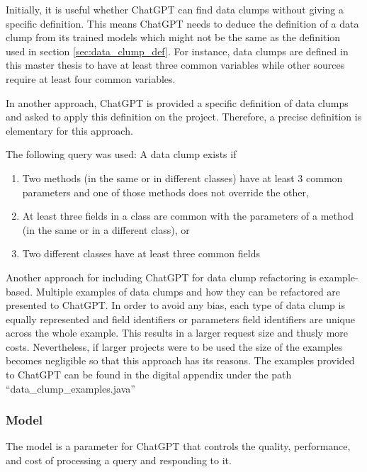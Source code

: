 Initially, it is useful whether ChatGPT can find data clumps without giving a specific definition. This means ChatGPT needs to deduce the definition of a data clump from its trained models which might not be the same as the definition used in section \ref{sec:data_clump_def}. For instance, data clumps are defined in this master thesis to have at least three common variables while other sources require at least four common variables. 
\begin{comment}
Nevertheless, the results are fairly good. ChatGPT ignores the inheritance between \textit{MathStuff} and \textit{BetterMathStuff} and does not output a data clump for each method in \textit{MathStuff}
\end{comment}


In another approach, ChatGPT is provided a specific definition of data clumps and asked to apply this definition on the project. Therefore, a precise definition is elementary for this approach.

The following query was used:
A data clump exists if
\begin{enumerate}
\item  Two methods (in the same or in different classes) have at least 3 common parameters
    and one of those methods does not override the other, 
\item At least three fields in a class are common with the parameters of a method (in the same or in a different class), or 
\item Two different classes have at least three common fields
\end{enumerate}


Another approach for including ChatGPT for data clump refactoring is example-based. Multiple examples of data clumps and how they can be refactored are presented to ChatGPT. In order to avoid any bias, each type of data clump is equally represented and field identifiers or parameters field identifiers are unique across the whole example. This results in a larger request size and thusly more costs. Nevertheless, if larger projects were to be used the size of the examples becomes negligible so that this approach has its reasons. The examples provided to ChatGPT can be found in the digital appendix under the path \enquote{data\_clump\_examples.java} 

\subsubsection{Model}
The model is a parameter for ChatGPT that controls the quality, performance, and cost of processing a query and responding to it. 

